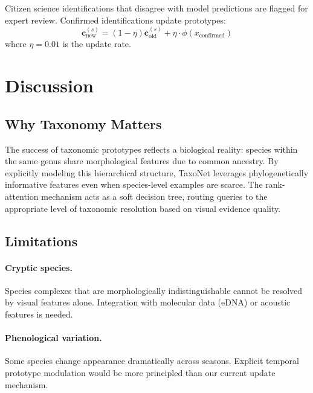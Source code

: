 \documentclass[11pt,a4paper]{article}
\begin{document}
Citizen science identifications that disagree with model predictions
are flagged for expert review. Confirmed identifications update
prototypes:
\begin{equation}
  \mathbf{c}_{\text{new}}^{(s)} = (1 - \eta) \mathbf{c}_{\text{old}}^{(s)}
  + \eta \cdot \phi(x_{\text{confirmed}})
\end{equation}
where $\eta = 0.01$ is the update rate.


\section{Discussion}
\label{sec:discussion}

\subsection{Why Taxonomy Matters}

The success of taxonomic prototypes reflects a biological reality:
species within the same genus share morphological features due to common
ancestry. By explicitly modeling this hierarchical structure, TaxoNet
leverages phylogenetically informative features even when species-level
examples are scarce. The rank-attention mechanism acts as a soft decision
tree, routing queries to the appropriate level of taxonomic resolution
based on visual evidence quality.

\subsection{Limitations}

\paragraph{Cryptic species.} Species complexes that are
morphologically indistinguishable cannot be resolved by visual features
alone. Integration with molecular data (eDNA) or acoustic features is
needed.

\paragraph{Phenological variation.} Some species change appearance
dramatically across seasons. Explicit temporal prototype modulation
would be more principled than our current update mechanism.
\end{document}

